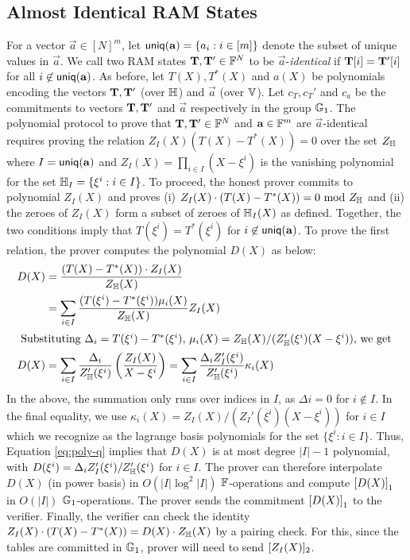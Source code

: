 \subsection{Almost Identical RAM States}\label{subsec:proximity-ram}
For a vector $\vec{a}\in [N]^m$, let $\mathsf{uniq}(\mathbf{{a}})=\{a_i: i\in [m]\}$ denote the subset of unique values in $\vec{a}$. We call two
RAM states $\mathbf{T}, \mathbf{T}'\in \mathbb{F}^N$ to be $\vec{a}$-{\em identical} if $\mathbf{T}[i]=\mathbf{T}'[i]$ for all $i\not\in\mathsf{uniq}(\mathbf{{a}})$. As before,
let $T(X),T^*(X)$ and $a(X)$ be polynomials encoding the vectors $\mathbf{T},\mathbf{T}'$ (over $\mathbb{H}$) and $\vec{a}$ (over $\mathbb{V}$). Let
$c_T, c_T'$ and $c_a$ be the commitments to vectors $\mathbf{T}, \mathbf{T}'$ and $\vec{a}$ respectively in the group $\mathbb{G}_1$. The polynomial protocol to prove that
$\mathbf{T},\mathbf{T}'\in \mathbb{F}^N$ and $\mathbf{a}\in \mathbb{F}^m$ are $\vec{a}$-identical requires proving the relation
$Z_I(X)(T(X) - T^*(X)) = 0$ over the set $Z_{\mathbb{H}}$ where
$I=\mathsf{uniq}(\mathbf{{a}})$ and $Z_I(X)=\prod_{i\in I}(X-\xi^i)$ is the vanishing polynomial for the set $\mathbb{H}_I=\{\xi^i: i\in I\}$.
To proceed, the honest prover commits to polynomial $Z_I(X)$ and proves (i) $Z_I(X)\cdot (T(X) - T^*(X)) = 0 \text{ mod } Z_{\mathbb{H}}$ and (ii) the zeroes of $Z_I(X)$ form a subset of zeroes of $\mathbb{H}_I(X)$ as defined.
Together, the two conditions imply that $T(\xi^i)=T^*(\xi^i)$ for $i\not\in \mathsf{uniq}(\mathbf{{a}})$.
To prove the first relation, the prover computes the polynomial $D(X)$ as below:
\begin{align}\label{eq:poly-q}
D(X) &= \frac{(T(X)-T^*(X))\cdot Z_I(X)}{Z_\setN(X)} \nonumber \\
&= \sum_{i\in I}\frac{(T(\xi^i) - T^*(\xi^i))\mu_i(X)}{Z_\setN(X)} Z_I(X) \nonumber \\
\intertext{ Substituting $\Delta_i=T(\xi^i) - T^*(\xi^i)$, $\mu_i(X)=\vpolyN(X)/(\vpolyN'(\xi^i)(X-\xi^i))$, we get }
D(X) &=\sum_{i\in I}\frac{\Delta_i}{Z_\setN'(\xi^i)}\left(\frac{Z_I(X)}{X-\xi^i}\right) = \sum_{i\in I}\frac{\Delta_i Z_I'(\xi^i)}{Z_\setN'(\xi^i)}\kappa_i(X)
\end{align}
In the above, the summation only runs over indices in $I$, as $\Delta i = 0$ for $i\not\in I$. In the final equality, we use
$\kappa_i(X) = Z_I(X)/(Z_I'(\xi^i)(X-\xi^i))$ for $i\in I$ which we recognize as the lagrange basis polynomials for the set
$\{\xi^i: i\in I\}$. Thus, Equation \eqref{eq:poly-q} implies that $D(X)$ is at most degree $|I|-1$ polynomial, with
$D(\xi^i)=\Delta_i Z_I'(\xi^i)/Z_\mathbb{H}'(\xi^i)$ for $i\in I$.
The prover can therefore interpolate $D(X)$ (in power basis)
in $O(|I|\log^2 |I|)$ $\mathbb{F}$-operations and compute $\left[{D(X)}\right]_1$ in $O(|I|)$ $\mathbb{G}_1$-operations. The prover sends the
commitment $\left[{D(X)}\right]_1$ to the verifier. Finally, the verifier can
check the identity $Z_I(X) \cdot  (T(X) - T^*(X)) = D(X) \cdot Z_{\mathbb{H}}(X)$ %
by a pairing check. For this, since the tables are committed in $\mathbb{G}_1$, prover will need to send $[Z_I(X)]_2$.

